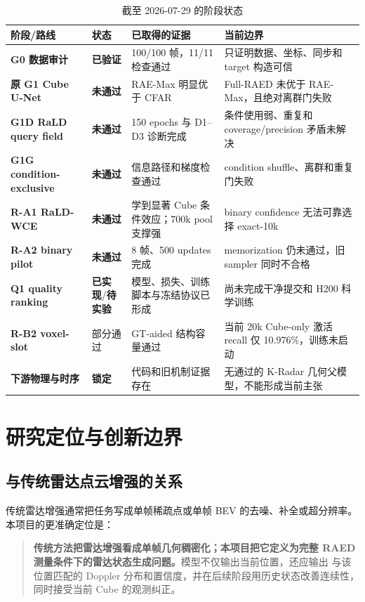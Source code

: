 \documentclass[11pt,a4paper,fontset=none]{ctexart}
\newcommand{\done}{\textcolor{RadarGreen}{\textbf{已验证}}}
\newcommand{\impl}{\textcolor{RadarBlue}{\textbf{已实现}}}
\newcommand{\pending}{\textcolor{RadarOrange}{\textbf{待实验}}}
\newcommand{\closed}{\textcolor{RadarRed}{\textbf{未通过}}}
\newcommand{\locked}{\textcolor{RadarGray}{\textbf{锁定}}}
\begin{document}
\begin{table}[H]
\centering
\small
\caption{截至 2026-07-29 的阶段状态}
\begin{tabularx}{\textwidth}{>{\bfseries}p{2.2cm} p{2.3cm} Y Y}
\toprule
阶段/路线 & 状态 & 已取得的证据 & 当前边界 \\
\midrule
G0 数据审计 & \done & 100/100 帧，11/11 检查通过 & 只证明数据、坐标、同步和 target 构造可信 \\
原 G1 Cube U-Net & \closed & RAE-Max 明显优于 CFAR & Full-RAED 未优于 RAE-Max，且绝对离群门失败 \\
G1D RaLD query field & \closed & 150 epochs 与 D1--D3 诊断完成 & 条件使用弱、重复和 coverage/precision 矛盾未解决 \\
G1G condition-exclusive & \closed & 信息路径和梯度检查通过 & condition shuffle、离群和重复门失败 \\
R-A1 RaLD-WCE & \closed & 学到显著 Cube 条件效应；700k pool 支撑强 & binary confidence 无法可靠选择 exact-10k \\
R-A2 binary pilot & \closed & 8 帧、500 updates 完成 & memorization 仍未通过，旧 sampler 同时不合格 \\
Q1 quality ranking & \impl/\pending & 模型、损失、训练脚本与冻结协议已形成 & 尚未完成干净提交和 H200 科学训练 \\
R-B2 voxel-slot & 部分通过 & GT-aided 结构容量通过 & 当前 20k Cube-only 激活 recall 仅 10.976\%，训练未启动 \\
下游物理与时序 & \locked & 代码和旧机制证据存在 & 无通过的 K-Radar 几何父模型，不能形成当前主张 \\
\bottomrule
\end{tabularx}
\end{table}

\section{研究定位与创新边界}

\subsection{与传统雷达点云增强的关系}

传统雷达增强通常把任务写成单帧稀疏点或单帧 BEV 的去噪、补全或超分辨率。
本项目的更准确定位是：
\begin{quote}
\textbf{传统方法把雷达增强看成单帧几何稠密化；本项目把它定义为完整
RAED 测量条件下的雷达状态生成问题。}模型不仅输出当前位置，还应输出
与该位置匹配的 Doppler 分布和置信度，并在后续阶段用历史状态改善连续性，
同时接受当前 Cube 的观测纠正。
\end{quote}
\end{document}
